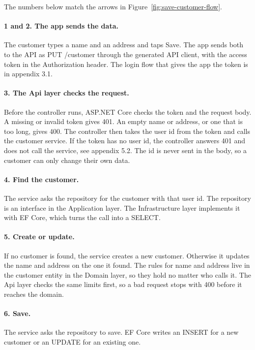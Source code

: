 \documentclass[a4paper,11pt]{article}
\begin{document}

The numbers below match the arrows in Figure~\ref{fig:save-customer-flow}.

\paragraph{1 and 2. The app sends the data.} The customer types a name and an address and taps Save. The app sends both to the API as PUT /customer through the generated API client, with the access token in the Authorization header. The login flow that gives the app the token is in appendix 3.1.

\paragraph{3. The Api layer checks the request.} Before the controller runs, ASP.NET Core checks the token and the request body. A missing or invalid token gives 401. An empty name or address, or one that is too long, gives 400. The controller then takes the user id from the token and calls the customer service. If the token has no user id, the controller answers 401 and does not call the service, see appendix 5.2. The id is never sent in the body, so a customer can only change their own data.

\paragraph{4. Find the customer.} The service asks the repository for the customer with that user id. The repository is an interface in the Application layer. The Infrastructure layer implements it with EF Core, which turns the call into a SELECT.

\paragraph{5. Create or update.} If no customer is found, the service creates a new customer. Otherwise it updates the name and address on the one it found. The rules for name and address live in the customer entity in the Domain layer, so they hold no matter who calls it. The Api layer checks the same limits first, so a bad request stops with 400 before it reaches the domain.

\paragraph{6. Save.} The service asks the repository to save. EF Core writes an INSERT for a new customer or an UPDATE for an existing one.
\end{document}
